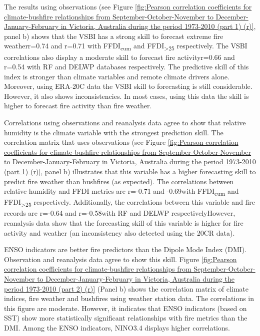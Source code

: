 The results using observations (see Figure \ref{fig:Pearson correlation coefficients for climate-bushfire relationships from September-October-November to December-January-February in Victoria, Australia during the period 1973-2010 (part 1) (r)},
panel b) shows that the VSBI has a strong skill to forecast extreme
fire weather\textemdash r=0.74 and r=0.71 with FFDI\textsubscript{cum}
and FFDI\textsubscript{>25} respectively\textemdash . The VSBI correlations
also display a moderate skill to forecast fire activity\textendash r=0.66
and r=0.54 with RF and DELWP databases respectively\textemdash . The
predictive skill of this index is stronger than climate variables
and remote climate drivers alone. Moreover, using ERA-20C data the
VSBI skill to forecasting is still considerable. However, it also
shows inconsistencies. In most cases, using this data the skill is
higher to forecast fire activity than fire weather.

Correlations using observations and reanalysis data agree to show
that relative humidity is the climate variable with the strongest
prediction skill. The correlation matrix that uses observations (see
Figure \ref{fig:Pearson correlation coefficients for climate-bushfire relationships from September-October-November to December-January-February in Victoria, Australia during the period 1973-2010 (part 1) (r)},
panel b) illustrates that this variable has a higher forecasting skill
to predict fire weather than bushfires (as expected). The correlations
between relative humidity and FFDI metrics are r=-0.71 and -0.69\textemdash with
FFDI\textsubscript{cum} and FFDI\textsubscript{>25} respectively\textemdash .
Additionally, the correlations between this variable and fire records
are r=-0.64 and r=-0.58\textemdash with RF and DELWP respectively\textemdash However,
reanalysis data show that the forecasting skill of this variable is
higher for fire activity and weather (an inconsistency also detected
using the 20CR data). 

ENSO indicators are better fire predictors than the Dipole Mode Index
(DMI). Observation and reanalysis data agree to show this skill. Figure
\ref{fig:Pearson correlation coefficients for climate-bushfire relationships from September-October-November to December-January-February in Victoria, Australia during the period 1973-2010 (part 2) (r)}
(Panel b) shows the correlation matrix of climate indices, fire weather
and bushfires using weather station data. The correlations in this
figure are moderate. However, it indicates that ENSO indicators (based
on SST) show more statistically significant relationships with fire
metrics than the DMI. Among the ENSO indicators, NINO3.4 displays
higher correlations.

